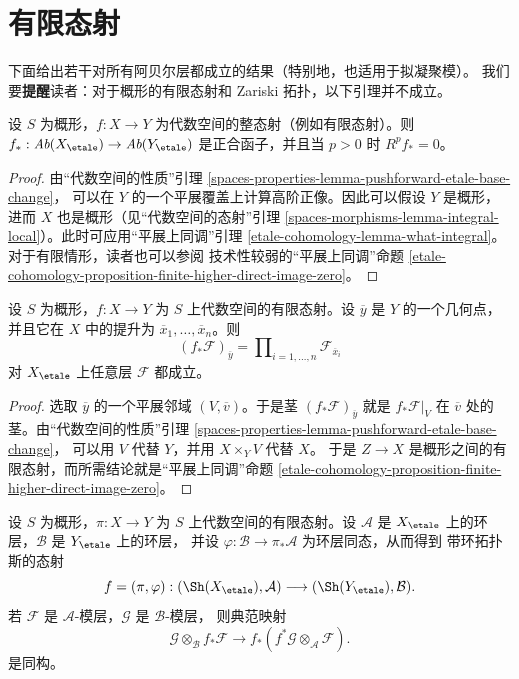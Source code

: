 \section{有限态射}
\label{section-finite-morphisms}

\noindent
下面给出若干对所有阿贝尔层都成立的结果（特别地，也适用于拟凝聚模）。
我们要{\bf 提醒}读者：对于概形的有限态射和 Zariski 拓扑，以下引理并不成立。

\begin{lemma}
\label{lemma-finite-higher-direct-image-zero}
设 $S$ 为概形，$f : X \to Y$ 为代数空间的整态射（例如有限态射）。则
$f_* : \textit{Ab}(X_\etale) \to \textit{Ab}(Y_\etale)$
是正合函子，并且当 $p > 0$ 时 $R^pf_* = 0$。
\end{lemma}

\begin{proof}
由“代数空间的性质”引理
\ref{spaces-properties-lemma-pushforward-etale-base-change}，
可以在 $Y$ 的一个平展覆盖上计算高阶正像。因此可以假设 $Y$ 是概形，
进而 $X$ 也是概形（见“代数空间的态射”引理
\ref{spaces-morphisms-lemma-integral-local}）。此时可应用“平展上同调”引理
\ref{etale-cohomology-lemma-what-integral}。对于有限情形，读者也可以参阅
技术性较弱的“平展上同调”命题
\ref{etale-cohomology-proposition-finite-higher-direct-image-zero}。
\end{proof}

\begin{lemma}
\label{lemma-stalk-push-finite}
设 $S$ 为概形，$f : X \to Y$ 为 $S$ 上代数空间的有限态射。设
$\overline{y}$ 是 $Y$ 的一个几何点，并且它在 $X$ 中的提升为
$\overline{x}_1, \ldots, \overline{x}_n$。则
$$
(f_*\mathcal{F})_{\overline{y}} =
\prod\nolimits_{i = 1, \ldots, n}
\mathcal{F}_{\overline{x}_i}
$$
对 $X_\etale$ 上任意层 $\mathcal{F}$ 都成立。
\end{lemma}

\begin{proof}
选取 $\overline{y}$ 的一个平展邻域 $(V, \overline{v})$。于是茎
$(f_*\mathcal{F})_{\overline{y}}$ 就是 $f_*\mathcal{F}|_V$ 在
$\overline{v}$ 处的茎。由“代数空间的性质”引理
\ref{spaces-properties-lemma-pushforward-etale-base-change}，
可以用 $V$ 代替 $Y$，并用 $X \times_Y V$ 代替 $X$。
于是 $Z \to X$ 是概形之间的有限态射，而所需结论就是“平展上同调”命题
\ref{etale-cohomology-proposition-finite-higher-direct-image-zero}。
\end{proof}

\begin{lemma}
\label{lemma-finite-rings}
设 $S$ 为概形，$\pi : X \to Y$ 为 $S$ 上代数空间的有限态射。设
$\mathcal{A}$ 是 $X_\etale$ 上的环层，$\mathcal{B}$ 是 $Y_\etale$ 上的环层，
并设 $\varphi : \mathcal{B} \to \pi_*\mathcal{A}$ 为环层同态，从而得到
带环拓扑斯的态射
$$
f = (\pi, \varphi) :
(\Sh(X_\etale), \mathcal{A})
\longrightarrow
(\Sh(Y_\etale), \mathcal{B}).
$$
若 $\mathcal{F}$ 是 $\mathcal{A}$-模层，$\mathcal{G}$ 是 $\mathcal{B}$-模层，
则典范映射
$$
\mathcal{G} \otimes_\mathcal{B} f_*\mathcal{F}
\longrightarrow
f_*(f^*\mathcal{G} \otimes_\mathcal{A} \mathcal{F}).
$$
是同构。
\end{lemma}

